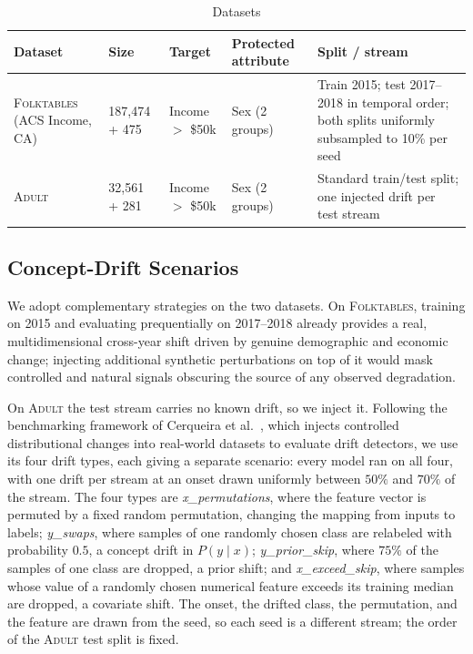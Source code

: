 \documentclass[conference]{IEEEtran}
\newcommand{\adult}{\textsc{Adult}}
\newcommand{\folk}{\textsc{Folktables}}
\begin{document}
\begin{table}[t]
\centering
\caption{Datasets}
\label{tab:datasets}
\setlength{\tabcolsep}{1.5pt}
\footnotesize
\begin{tabular}{@{}L{1.6cm} L{1.25cm} L{1.05cm} L{1.15cm} L{2.5cm}@{}}
\toprule
Dataset & Size & Target & Protected attribute & Split / stream \\
\midrule
\folk{} (ACS Income, CA) & 187{,}474 + 475 & Income $>$ \$50k & Sex (2 groups) & Train 2015; test 2017--2018 in temporal order; both splits uniformly subsampled to 10\% per seed \\
\adult{} & 32{,}561 + 281 & Income $>$ \$50k & Sex (2 groups) & Standard train/test split; one injected drift per test stream \\
\bottomrule
\end{tabular}
\end{table}

\subsection{Concept-Drift Scenarios}
\label{sec:method:scenarios}
We adopt complementary strategies on the two datasets. On \folk{}, training on 2015 
and evaluating prequentially on 2017--2018 already provides a real,
multidimensional cross-year shift driven by genuine demographic and economic change; 
injecting additional synthetic perturbations on top of it would mask
controlled and natural signals obscuring the source of any observed degradation.

On \adult{} the test stream carries no known drift, so we inject it. 
Following the benchmarking framework of Cerqueira et al.~\cite{10.1145/3770855.3819070}, which injects 
controlled distributional changes into real-world datasets to evaluate drift detectors, we use its four drift types, 
each giving a separate scenario: every model ran on all four, with one drift per stream at an onset drawn uniformly between $50\%$ 
and $70\%$ of the stream. The four types are \emph{x\_permutations}, where the feature vector 
is permuted by a fixed random permutation, changing the mapping from inputs to labels;
\emph{y\_swaps}, where samples of one randomly chosen class are relabeled with probability $0.5$, 
a concept drift in $P(y\mid x)$; \emph{y\_prior\_skip}, where
$75\%$ of the samples of one class are dropped, a prior shift; and \emph{x\_exceed\_skip}, 
where samples whose value of a randomly chosen numerical feature exceeds
its training median are dropped, a covariate shift. The onset, the drifted class, the 
permutation, and the feature are drawn from the seed, so each seed is a
different stream; the order of the \adult{} test split is fixed.
\end{document}
